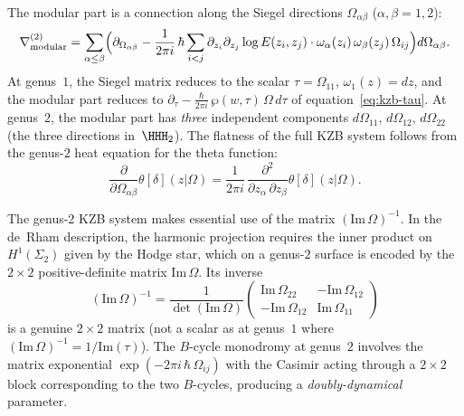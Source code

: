 The modular part is a connection along the Siegel
directions $\Omega_{\alpha\beta}$ ($\alpha, \beta = 1, 2$):
\begin{equation}\label{eq:kzb-g2-modular}
  \nabla^{(2)}_{\mathrm{modular}}
  = \sum_{\alpha \leq \beta}
  \Bigl(
  \partial_{\Omega_{\alpha\beta}}
  - \frac{1}{2\pi i}\,\hbar
  \sum_{i < j}
  \partial_{z_i}\partial_{z_j}
  \log E(z_i, z_j) \cdot
  \omega_\alpha(z_i)\,\omega_\beta(z_j)\,
  \Omega_{ij}
  \Bigr)
  d\Omega_{\alpha\beta}.
\end{equation}
At genus~$1$, the Siegel matrix reduces to the scalar
$\tau = \Omega_{11}$, $\omega_1(z) = dz$, and the modular
part reduces to
$\partial_\tau - \frac{\hbar}{2\pi i}\,
\wp(w, \tau)\,\Omega\,d\tau$
of equation~\eqref{eq:kzb-tau}. At genus~$2$, the modular
part has \emph{three} independent components
$d\Omega_{11}$, $d\Omega_{12}$, $d\Omega_{22}$ (the three
directions in~$\HHH_2$). The flatness of the full KZB
system follows from the genus-$2$ heat equation for the
theta function:
\begin{equation}\label{eq:heat-g2}
  \frac{\partial}{\partial \Omega_{\alpha\beta}}
  \theta[\delta](z|\Omega)
  = \frac{1}{2\pi i}\,
  \frac{\partial^2}{\partial z_\alpha\,\partial z_\beta}
  \theta[\delta](z|\Omega).
\end{equation}

\begin{remark}
\label{rem:matrix-structure-g2}
The genus-$2$ KZB system makes essential use of the
matrix $(\mathrm{Im}\,\Omega)^{-1}$. In the de~Rham
description, the harmonic projection requires the
inner product on $H^1(\Sigma_2)$ given by the Hodge
star, which on a genus-$2$ surface is encoded by the
$2 \times 2$ positive-definite matrix
$\mathrm{Im}\,\Omega$. Its inverse
\begin{equation}\label{eq:im-omega-inv}
  (\mathrm{Im}\,\Omega)^{-1}
  = \frac{1}{\det(\mathrm{Im}\,\Omega)}
  \begin{pmatrix}
    \mathrm{Im}\,\Omega_{22} &
    -\mathrm{Im}\,\Omega_{12} \\
    -\mathrm{Im}\,\Omega_{12} &
    \mathrm{Im}\,\Omega_{11}
  \end{pmatrix}
\end{equation}
is a genuine $2 \times 2$ matrix (not a scalar as at
genus~$1$ where $(\mathrm{Im}\,\Omega)^{-1} =
1/\mathrm{Im}(\tau)$). The $B$-cycle monodromy at
genus~$2$ involves the matrix exponential
$\exp(-2\pi i\,\hbar\,\Omega_{ij})$ with the Casimir
acting through a $2 \times 2$ block corresponding to
the two $B$-cycles, producing a \emph{doubly-dynamical}
parameter.
\end{remark}

